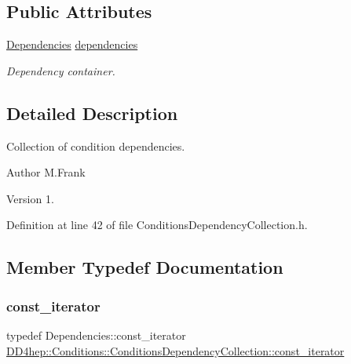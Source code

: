 \subsection*{Public Attributes}
\begin{DoxyCompactItemize}
\item 
\hyperlink{class_d_d4hep_1_1_conditions_1_1_conditions_dependency_collection_a7fb4072b6036f59389b929e312e2679c}{Dependencies} \hyperlink{class_d_d4hep_1_1_conditions_1_1_conditions_dependency_collection_aec9ef437ecf9857dbbda3f494be276b9}{dependencies}
\begin{DoxyCompactList}\small\item\em Dependency container. \end{DoxyCompactList}\end{DoxyCompactItemize}


\subsection{Detailed Description}
Collection of condition dependencies. 

\begin{DoxyAuthor}{Author}
M.\+Frank 
\end{DoxyAuthor}
\begin{DoxyVersion}{Version}
1. 
\end{DoxyVersion}


Definition at line 42 of file Conditions\+Dependency\+Collection.\+h.



\subsection{Member Typedef Documentation}
\hypertarget{class_d_d4hep_1_1_conditions_1_1_conditions_dependency_collection_ab5e9bcdc3330c3b694303f627799dc84}{}\label{class_d_d4hep_1_1_conditions_1_1_conditions_dependency_collection_ab5e9bcdc3330c3b694303f627799dc84} 
\subsubsection{\texorpdfstring{const\+\_\+iterator}{const\_iterator}}
{\footnotesize\ttfamily typedef Dependencies\+::const\+\_\+iterator \hyperlink{class_d_d4hep_1_1_conditions_1_1_conditions_dependency_collection_ab5e9bcdc3330c3b694303f627799dc84}{D\+D4hep\+::\+Conditions\+::\+Conditions\+Dependency\+Collection\+::const\+\_\+iterator}}



